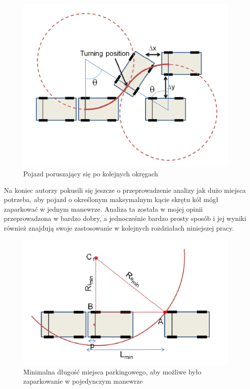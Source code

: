 \documentclass[a4paper,11pt,twoside]{report}
\theoremstyle{definition}
\begin{document}
\begin{figure}[h!]
\centering
\includegraphics[scale=0.6]{easyPathPlanning2}
\caption[Pojazd poruszający się po kolejnych okręgach]{Pojazd poruszający się po kolejnych okręgach}
\end{figure}

Na koniec autorzy pokusili się jeszcze o przeprowadzenie analizy jak dużo miejsca potrzeba, aby pojazd o określonym maksymalnym kącie skrętu kół mógł zaparkować w jednym manewrze. Analiza ta została w mojej opinii przeprowadzona w bardzo dobry, a jednocześnie bardzo prosty sposób i jej wyniki również znajdują swoje zastosowanie w kolejnych rozdziałach niniejszej pracy.

\begin{figure}[h!]
\centering
\includegraphics[scale=0.6]{easyPathPlanning3}
\caption[Minimalna długość miejsca parkingowego, aby możliwe było zaparkowanie w pojedynczym manewrze]{Minimalna długość miejsca parkingowego, aby możliwe było zaparkowanie w pojedynczym manewrze}
\end{figure}
\end{document}
